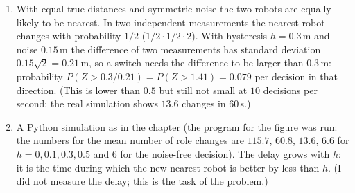 \begin{enumerate}[label=\textbf{\ansnum.\arabic*}]
  \item With equal true distances and symmetric noise the two robots are equally likely to be nearest. In two independent measurements the nearest robot changes with probability $1/2$ ($1/2\cdot1/2\cdot2$). With hysteresis $h=0.3$\,m and noise $0.15$\,m the difference of two measurements has standard deviation $0.15\sqrt2=0.21$\,m, so a switch needs the difference to be larger than $0.3$\,m: probability $P(Z>0.3/0.21)=P(Z>1.41)=0.079$ per decision in that direction. (This is lower than $0.5$ but still not small at $10$ decisions per second; the real simulation shows $13.6$ changes in $60$\,s.)
  \item A Python simulation as in the chapter (the program for the figure was run: the numbers for the mean number of role changes are $115.7$, $60.8$, $13.6$, $6.6$ for $h=0,0.1,0.3,0.5$ and $6$ for the noise-free decision). The delay grows with $h$: it is the time during which the new nearest robot is better by less than $h$. (I did not measure the delay; this is the task of the problem.)
\end{enumerate}
